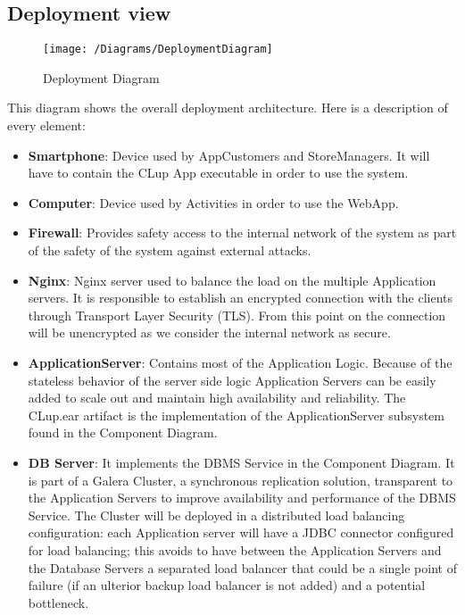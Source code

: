 \subsection{Deployment view}
\begin{figure}[H]
	\centering
	\texttt{[image: /Diagrams/DeploymentDiagram]}
	\caption{Deployment Diagram}
\end{figure}

This diagram shows the overall deployment architecture. Here is a description of every element:\\
\begin{itemize}
    \item \textbf{Smartphone}: Device used by AppCustomers and StoreManagers. It will have to contain the CLup App executable in order to use the system.
    
    \item \textbf{Computer}: Device used by Activities in order to use the WebApp.
    
    \item \textbf{Firewall}: Provides safety access to the internal network of the system as part of the safety of the system against external attacks.
    
    \item \textbf{Nginx}: Nginx server used to balance the load on the multiple Application servers. It is responsible to establish an encrypted connection with the clients through Transport Layer Security (TLS). From this point on the connection will be unencrypted as we consider the internal network as secure.
    
    \item \textbf{ApplicationServer}: Contains most of the Application Logic. Because of the stateless behavior of the server side logic Application Servers can be easily added to scale out and maintain high availability and reliability. The CLup.ear artifact is the implementation of the ApplicationServer subsystem found in the Component Diagram.
    
    \item \textbf{DB Server}: It implements the DBMS Service in the Component Diagram. It is part of a Galera Cluster, a synchronous replication solution, transparent to the Application Servers to improve availability and performance of the DBMS Service. The Cluster will be deployed in a distributed load balancing configuration: each Application server will have a JDBC connector configured for load balancing; this avoids to have between the Application Servers and the Database Servers a separated load balancer that could be a single point of failure (if an ulterior backup load balancer is not added) and a potential bottleneck.

\end{itemize}



